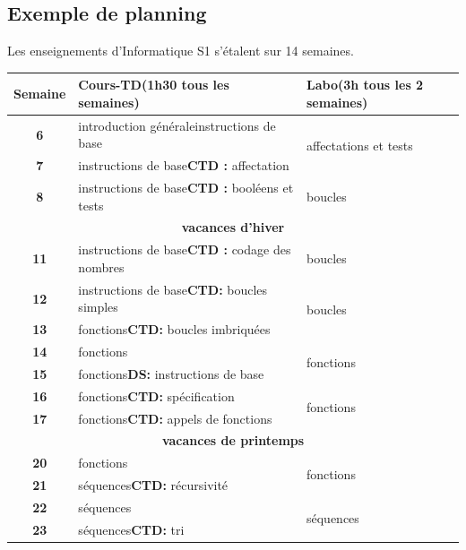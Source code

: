 \subsection{Exemple de planning}\label{annexe:planning}
Les enseignements d'Informatique S1 s'étalent sur 14 semaines.

\begin{longtable}{|c|p{6cm}|p{6cm}|}
\hline
\bf Semaine & {\bf Cours-TD}\hfill (1h30 tous les semaines)& {\bf Labo}\hfill (3h tous les 2 semaines)\\
\hline
\bf 6 	& introduction générale\newline instructions de base
		& \multirow{2}{6cm}{affectations et tests}
		\\
\cline{1-2}
\bf 7 	& instructions de base\newline \textbf{CTD :} affectation 
        & 
        \\
\hline
\bf 8 	& instructions de base\newline \textbf{CTD :} booléens et tests
        & boucles
        \\
\hline
\multicolumn{3}{|c|}{\bf vacances d'hiver}\\
\hline
\bf 11 	& instructions de base\newline \textbf{CTD :} codage des nombres
       	& boucles
       	\\
\hline
\bf 12  & instructions de base\newline \textbf{CTD:} boucles simples
		& \multirow{2}{6cm}{boucles}
		\\
\cline{1-2}
\bf 13 	& fonctions\newline \textbf{CTD:} boucles imbriquées
		& 
		\\
\hline
\bf 14 	& fonctions
		& \multirow{2}{6cm}{fonctions}
		\\
\cline{1-2}
\bf 15 	& fonctions\newline \textbf{DS:} instructions de base
		& 
		\\
\hline
\bf 16 	& fonctions\newline \textbf{CTD:} spécification
		& \multirow{2}{6cm}{fonctions}
		\\
\cline{1-2}
\bf 17 	& fonctions\newline \textbf{CTD:} appels de fonctions
		& 
		\\
\hline
\multicolumn{3}{|c|}{\bf vacances de printemps}\\
\hline
\bf 20 	& fonctions
		& \multirow{2}{6cm}{fonctions}
		\\
\cline{1-2}
\bf 21 	& séquences\newline \textbf{CTD:} récursivité
		& 
		\\
\hline
\bf 22 	& séquences
		& \multirow{2}{6cm}{séquences}
		\\
\cline{1-2}
\bf 23 	& séquences\newline \textbf{CTD:} tri
		&
		\\
\hline
\end{longtable}

